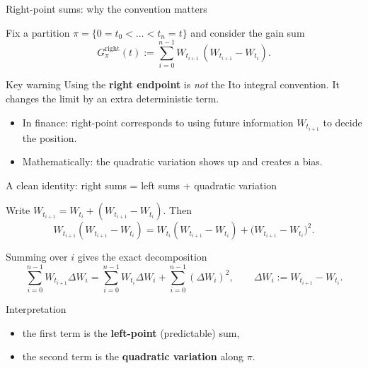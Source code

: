 \documentclass[10pt,aspectratio=169]{beamer}
\begin{document}
\begin{frame}{Right-point sums: why the convention matters}

Fix a partition $\pi=\{0=t_0<\dots<t_n=t\}$ and consider the gain sum\pause
\[
G^{\mathrm{right}}_\pi(t)
:=\sum_{i=0}^{n-1} W_{t_{i+1}}\,(W_{t_{i+1}}-W_{t_i}).
\]
\pause

\begin{alertblock}{Key warning}
Using the \textbf{right endpoint} is \emph{not} the Ito integral convention.
It changes the limit by an extra deterministic term.
\end{alertblock}
\pause

\begin{itemize}
  \item In finance: right-point corresponds to using future information $W_{t_{i+1}}$ to decide the position.\pause
  \item Mathematically: the quadratic variation shows up and creates a bias.\pause
\end{itemize}

\end{frame}

\begin{frame}{A clean identity: right sums = left sums + quadratic variation}

Write $W_{t_{i+1}}=W_{t_i}+(W_{t_{i+1}}-W_{t_i})$. Then\pause
\[
W_{t_{i+1}}(W_{t_{i+1}}-W_{t_i})
=
W_{t_i}(W_{t_{i+1}}-W_{t_i})
+\big(W_{t_{i+1}}-W_{t_i}\big)^2.
\]
\pause

Summing over $i$ gives the exact decomposition\pause
\[
\sum_{i=0}^{n-1} W_{t_{i+1}}\Delta W_i
=
\sum_{i=0}^{n-1} W_{t_i}\Delta W_i
+\sum_{i=0}^{n-1} (\Delta W_i)^2,
\qquad \Delta W_i:=W_{t_{i+1}}-W_{t_i}.
\]
\pause

\begin{block}{Interpretation}
\begin{itemize}
  \item the first term is the \textbf{left-point} (predictable) sum,
  \item the second term is the \textbf{quadratic variation} along $\pi$.
\end{itemize}
\end{block}

\end{frame}
\end{document}
